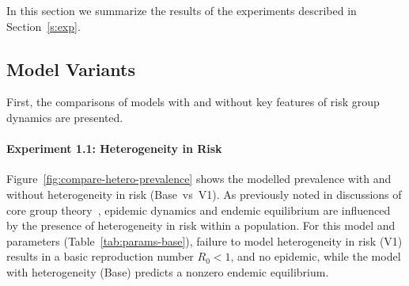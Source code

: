 In this section we summarize the results of the experiments described in Section~\ref{s:exp}.
\subsection{Model Variants}\label{ss:res-variants}
First, the comparisons of models with and without
key features of risk group dynamics are presented.
\paragraph{Experiment 1.1: Heterogeneity in Risk}\label{p:res-1-hetero}
Figure~\ref{fig:compare-hetero-prevalence} shows the modelled prevalence
with and without heterogeneity in risk (Base~vs~V1).
As previously noted in discussions of core group theory~\citep{Yorke1978,Stigum1994},
epidemic dynamics and endemic equilibrium are influenced by the presence of
heterogeneity in risk within a population.
For this model and parameters (Table~\ref{tab:params-base}),
failure to model heterogeneity in risk (V1) results in
a basic reproduction number $R_0 < 1$, and no epidemic,
while the model with heterogeneity (Base) predicts a nonzero endemic equilibrium.
